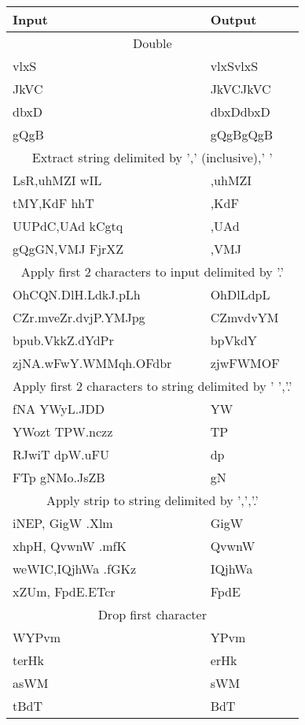 \documentclass{article}
\begin{document}
\begin{center}
\begin{tabular}{|l|l|}
  \hline Input&Output\\
  \hline\multicolumn{2}{|c|}{Double}\\
  \hline
vlxS & vlxSvlxS \\
 JkVC & JkVCJkVC \\
 dbxD & dbxDdbxD \\
 gQgB & gQgBgQgB \\
  \hline\multicolumn{2}{|c|}{Extract string delimited by ',' (inclusive),' '}\\
  \hline
LsR,uhMZI wIL & ,uhMZI  \\
 tMY,KdF hhT & ,KdF  \\
 UUPdC,UAd kCgtq & ,UAd  \\
 gQgGN,VMJ FjrXZ & ,VMJ \\
  \hline\multicolumn{2}{|c|}{Apply first 2 characters to input delimited by '.'}\\
  \hline
OhCQN.DlH.LdkJ.pLh & OhDlLdpL \\
 CZr.mveZr.dvjP.YMJpg & CZmvdvYM \\
 bpub.VkkZ.dYdPr & bpVkdY \\
 zjNA.wFwY.WMMqh.OFdbr & zjwFWMOF \\
  \hline\multicolumn{2}{|c|}{Apply first 2 characters to string delimited by ' ','.'}\\
  \hline
fNA YWyL.JDD & YW \\
 YWozt TPW.nczz & TP \\
 RJwiT dpW.uFU & dp \\
 FTp gNMo.JsZB & gN \\
  \hline\multicolumn{2}{|c|}{Apply strip to string delimited by ',','.'}\\
  \hline
iNEP,  GigW .Xlm & GigW \\
 xhpH,  QvwnW .mfK & QvwnW \\
 weWIC,IQjhWa .fGKz & IQjhWa \\
 xZUm, FpdE.ETcr & FpdE \\
  \hline\multicolumn{2}{|c|}{Drop first character}\\
  \hline
WYPvm & YPvm \\
 terHk & erHk \\
 asWM & sWM \\
 tBdT & BdT \\
\hline
\end{tabular}
\end{center}




\end{document}
